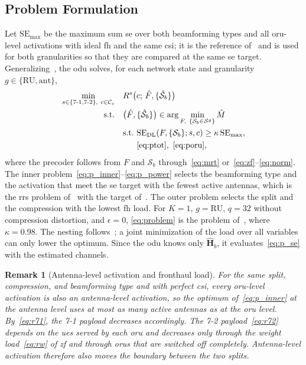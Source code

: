 \documentclass[10pt, final, journal, letterpaper, twocolumn]{IEEEtran}
\newtheorem{remark}{Remark}
\newcommand{\SE}{\mathrm{SE}}
\newcommand{\bHh}{\hat{\mathbf{H}}}
\newcommand{\sone}{7\text{-}1}
\newcommand{\stwo}{7\text{-}2}
\begin{document}
\subsection{Problem Formulation}\label{sec:problem}

Let $\SE_{\max}$ be the maximum sum \gls{se} over both beamforming types and all \gls{oru}-level activations with ideal \gls{fh} and the same \gls{csi}; it is the reference of~\cite[eq.~(7)]{girycki2024eucnc} and is used for both granularities so that they are compared at the same \gls{se} target. Generalizing~\cite[eqs.~(6)--(8)]{girycki2024eucnc}, the \gls{odu} solves, for each network state and granularity $g \in \{\mathrm{RU}, \mathrm{ant}\}$,
\begin{subequations}\label{eq:problem}
\begin{align}
  \min_{s \in \{\sone, \stwo\},\ c \in \mathcal{C}_s} \quad & R^{s}\big(c;\, \hat{F}, \{\hat{\mathcal{S}}_b\}\big) \label{eq:p_obj}\\
  \text{s.t.} \quad & \big(\hat{F}, \{\hat{\mathcal{S}}_b\}\big) \in \arg\min_{F,\ \{\mathcal{S}_b \in \mathcal{S}^{g}\}} \hat{M} \label{eq:p_inner}\\
  & \text{s.t.}\ \SE_{\mathrm{DL}}(F, \{\mathcal{S}_b\}; s, c) \ge \kappa\, \SE_{\max}, \label{eq:p_se}\\
  & \phantom{\text{s.t.}}\ \eqref{eq:ptot},\ \eqref{eq:poru}, \label{eq:p_power}
\end{align}
\end{subequations}
where the precoder follows from $F$ and $\mathcal{S}_b$ through~\eqref{eq:mrt} or~\eqref{eq:zf}--\eqref{eq:norm}. The inner problem~\eqref{eq:p_inner}--\eqref{eq:p_power} selects the beamforming type and the activation that meet the \gls{se} target with the fewest active antennas, which is the \gls{rrs} problem of~\cite{girycki2024twc} with the target of~\cite{girycki2024eucnc}. The outer problem selects the split and the compression with the lowest \gls{fh} load. For $K = 1$, $g = \mathrm{RU}$, $q = 32$ without compression distortion, and $\epsilon = 0$, \eqref{eq:problem} is the problem of~\cite{girycki2024eucnc}, where $\kappa = 0.98$. The nesting follows~\cite{girycki2024eucnc}; a joint minimization of the load over all variables can only lower the optimum. Since the \gls{odu} knows only $\bHh_b$, it evaluates~\eqref{eq:p_se} with the estimated channels.

\begin{remark}[Antenna-level activation and fronthaul load]\label{rem:granularity}
For the same split, compression, and beamforming type and with perfect \gls{csi}, every \gls{oru}-level activation is also an antenna-level activation, so the optimum of~\eqref{eq:p_inner} at the antenna level uses at most as many active antennas as at the \gls{oru} level. By~\eqref{eq:r71}, the 7-1 payload decreases accordingly. The 7-2 payload~\eqref{eq:r72} depends on the \glspl{ue} served by each \gls{oru} and decreases only through the weight load~\eqref{eq:rw} of \gls{zf} and through \glspl{oru} that are switched off completely. Antenna-level activation therefore also moves the boundary between the two splits.
\end{remark}
\end{document}
